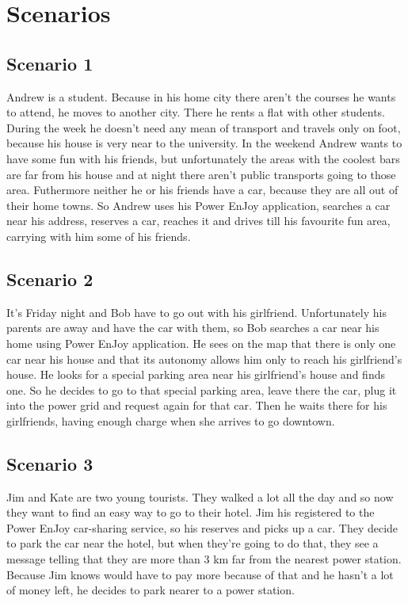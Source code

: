 \section{Scenarios}

\subsection{Scenario 1}

Andrew is a student. Because in his home city there aren't the courses he wants to attend, he moves to another city. There he rents a flat with other students. During the week he doesn't need any mean of transport and travels only on foot,  because his house is very near to the university. In the weekend Andrew wants to have some fun with his friends, but	unfortunately the areas with the coolest bars are far from his house and at night there aren't public transports going to those area. Futhermore neither he or his friends have a car, because they are all out of their home towns. So Andrew uses his Power EnJoy application, searches a car near his address, reserves a car, reaches it and drives till his favourite fun area, carrying with him some of his friends.

\subsection{Scenario 2}

It's Friday night and Bob have to go out with his girlfriend. Unfortunately his parents are away and have the car with them, so Bob searches a car near his home using Power EnJoy application. He sees on the map that there is only one car near his house and that its autonomy allows him only to reach his girlfriend's house. He looks for a special parking area near his girlfriend's house and finds one.
So he decides to go to that special parking area, leave there the car, plug it into the power grid and request again for that car. Then he waits there for his girlfriends, having enough charge when she arrives to go downtown.

\subsection{Scenario 3}

Jim and Kate are two young tourists. They walked a lot all the day and so now they want to find an easy way to go to their hotel.
Jim his registered to the Power EnJoy car-sharing service, so his reserves and picks up a car. They decide to park the car near the hotel, but when they're going to do that, they see a message telling that they are more than 3 km far from the nearest power station. Because Jim knows would have to pay more because of that and he hasn't a lot of money left, he decides to park nearer to a power station.
    

